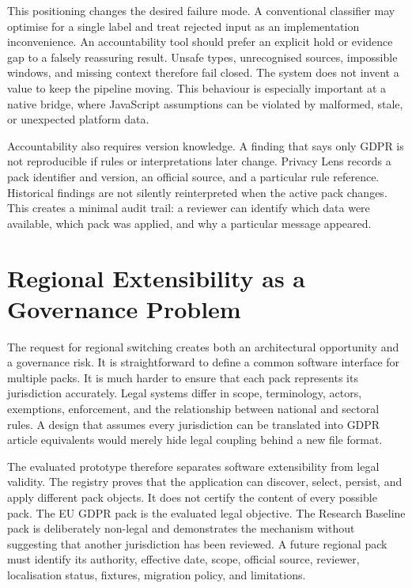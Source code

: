 This positioning changes the desired failure mode. A conventional classifier may optimise for a single label and treat rejected input as an implementation inconvenience. An accountability tool should prefer an explicit hold or evidence gap to a falsely reassuring result. Unsafe types, unrecognised sources, impossible windows, and missing context therefore fail closed. The system does not invent a value to keep the pipeline moving. This behaviour is especially important at a native bridge, where JavaScript assumptions can be violated by malformed, stale, or unexpected platform data.

Accountability also requires version knowledge. A finding that says only GDPR is not reproducible if rules or interpretations later change. Privacy Lens records a pack identifier and version, an official source, and a particular rule reference. Historical findings are not silently reinterpreted when the active pack changes. This creates a minimal audit trail: a reviewer can identify which data were available, which pack was applied, and why a particular message appeared.

\section{Regional Extensibility as a Governance Problem}

The request for regional switching creates both an architectural opportunity and a governance risk. It is straightforward to define a common software interface for multiple packs. It is much harder to ensure that each pack represents its jurisdiction accurately. Legal systems differ in scope, terminology, actors, exemptions, enforcement, and the relationship between national and sectoral rules. A design that assumes every jurisdiction can be translated into GDPR article equivalents would merely hide legal coupling behind a new file format.

The evaluated prototype therefore separates software extensibility from legal validity. The registry proves that the application can discover, select, persist, and apply different pack objects. It does not certify the content of every possible pack. The EU GDPR pack is the evaluated legal objective. The Research Baseline pack is deliberately non-legal and demonstrates the mechanism without suggesting that another jurisdiction has been reviewed. A future regional pack must identify its authority, effective date, scope, official source, reviewer, localisation status, fixtures, migration policy, and limitations.

